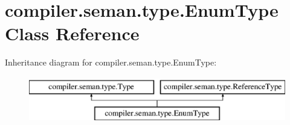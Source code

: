 \hypertarget{classcompiler_1_1seman_1_1type_1_1_enum_type}{}\section{compiler.\+seman.\+type.\+Enum\+Type Class Reference}
\label{classcompiler_1_1seman_1_1type_1_1_enum_type}
Inheritance diagram for compiler.\+seman.\+type.\+Enum\+Type\+:\begin{figure}[H]
\begin{center}
\leavevmode
\includegraphics[height=2.000000cm]{classcompiler_1_1seman_1_1type_1_1_enum_type}
\end{center}
\end{figure}
